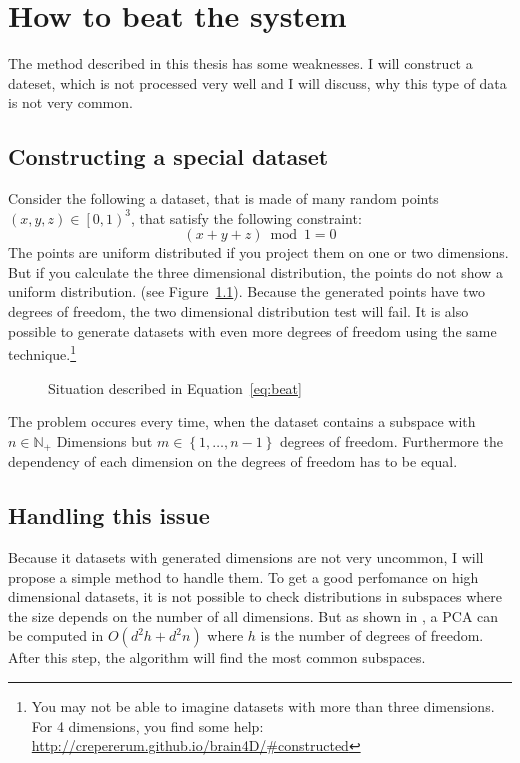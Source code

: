 \documentclass[%
	fontsize=11pt,%
	paper=a4,%
	pagesize,%
	twoside=false,%
	listof=totoc,%
	draft%
]{scrbook}
\newcommand{\set}[1]{\mathbb{#1}}
\begin{document}
\chapter{How to beat the system}
The method described in this thesis has some weaknesses. I will construct a dateset, which is not processed very well and I will discuss, why this type of data is not very common.

\section{Constructing a special dataset}\label{sec:constr}
Consider the following a dataset, that is made of many random points $(x, y, z) \in \left[0, 1\right)^3$, that satisfy the following constraint:
\begin{equation}\label{eq:beat}
	(x + y + z) \bmod 1 = 0
\end{equation}
The points are uniform distributed if you project them on one or two dimensions. But if you calculate the three dimensional distribution, the points do not show a uniform distribution. (see Figure~\ref{fig:beat}). Because the generated points have two degrees of freedom, the two dimensional distribution test will fail. It is also possible to generate datasets with even more degrees of freedom using the same technique.\footnote{You may not be able to imagine datasets with more than three dimensions. For 4 dimensions, you find some help: \url{http://crepererum.github.io/brain4D/\#constructed}}
\begin{figure}
	\caption{Situation described in Equation~\ref{eq:beat}}
	\label{fig:beat}
	\hfill
	\hfill
	\hfill
\end{figure}

The problem occures every time, when the dataset contains a subspace with $n \in \set{N}_+$ Dimensions but $m \in \left\{1,\dots,n-1\right\}$ degrees of freedom. Furthermore the dependency of each dimension on the degrees of freedom has to be equal.

\section{Handling this issue}
Because it datasets with generated dimensions are not very uncommon, I will propose a simple method to handle them. To get a good perfomance on high dimensional datasets, it is not possible to check distributions in subspaces where the size depends on the number of all dimensions. But as shown in \cite{journals/prl/SharmaP07}, a PCA can be computed in $O\left( d^2h + d^2n \right)$ where $h$ is the number of degrees of freedom. After this step, the algorithm will find the most common subspaces.
\end{document}
